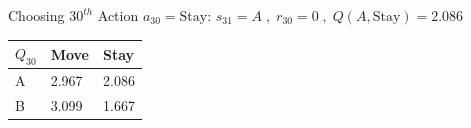 \documentclass[a4paper]{article}
\theoremstyle{definition}
\newenvironment{soln}{
    \leavevmode\color{blue}\ignorespaces
}{}
\begin{document}
\begin{enumerate}
\begin{soln}
\begin{center}
        \end{center}
Choosing $30^{th}$ Action $a_{30} = \text{Stay}$: $s_{31}=A\;,\;r_{30}=0\;,\;Q(A,\text{Stay}) = 2.086$
        \begin{center}
            \begin{tabular}{ | m{5em} | m{5em}| m{5em} |} 
            \hline
            $Q_{30}$ & Move & Stay \\ 
            \hline
            A & 2.967 & 2.086  \\
            \hline
            B & 3.099 & 1.667 \\ 
            \hline
            \end{tabular}
        \end{center}

\end{soln}

\end{enumerate}
\end{document}
